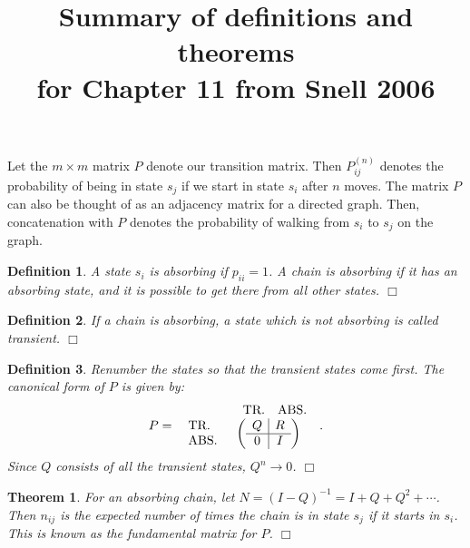 \documentclass[11pt, letterpaper]{article}
\newenvironment{definition}
{\noindent\begin{defn}}
{\hfill $\Box$ \end{defn}}
\newtheorem{defn}{Definition}
\newenvironment{theorem}
{\noindent\begin{thm}}
{\hfill $\Box$ \end{thm}}
\newtheorem{thm}{Theorem}
\begin{document}
\title{Summary of definitions and theorems\\for Chapter 11 from Snell 2006}
\maketitle


Let the $m \times m$ matrix $P$ denote our transition matrix.  Then $P^{(n)}_{ij}$ denotes the probability of being in state $s_j$ if we start in state $s_i$ after $n$ moves. The matrix $P$ can also be thought of as an adjacency matrix for a directed graph. Then, concatenation with $P$ denotes the probability of walking from $s_i$ to $s_j$ on the graph. \\

\begin{definition} A state $s_i$ is \textit{absorbing} if $p_{ii} = 1$.  A chain is \textit{absorbing} if it has an absorbing state, and it is possible to get there from all other states.
\end{definition}

\begin{definition} If a chain is absorbing, a state which is not absorbing is called \textit{transient}.
\end{definition}

\begin{definition} Renumber the states so that the transient states come first.  The \textit{canonical form} of $P$ is given by:
\[
	P = \begin{array}{l l}
		& \begin{array}{l l}\textrm{TR.} & \textrm{ABS.}\end{array} \\
		\begin{array}{l}\textrm{TR.} \\ \textrm{ABS.}\end{array} & 
		\left( \begin{array}{c | c} Q & R \\ \hline 0 & I \end{array} \right)
	    \end{array}.
\]
Since $Q$ consists of all the transient states, $Q^n \rightarrow 0$.
\end{definition}

\begin{theorem}
For an absorbing chain, let $N = (I-Q)^{-1} = I + Q + Q^2 + \cdots$.  Then $n_{ij}$ is the expected number of times the chain is in state $s_j$ if it starts in $s_i$.  This is known as the \textit{fundamental matrix} for $P$.
\end{theorem}
\end{document}
